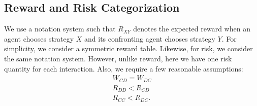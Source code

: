\documentclass[letterpaper]{article} %
\begin{document}
\subsection{Reward and Risk Categorization}
\label{sec:reward_risk_categories}
We use a notation system such that $R_{XY}$ denotes the expected reward when an agent chooses strategy $X$ and its confronting agent chooses strategy $Y$. For simplicity, we consider a symmetric reward table. Likewise, for risk, we consider the same notation system. However, unlike reward, here we have one risk quantity for each interaction. Also, we require a few reasonable assumptions:
\begin{gather}
    W_{CD}=W_{DC} \\
    R_{DD}<R_{CD}\label{eq:assumption2}\\
    R_{CC}<R_{DC}.\label{eq:assumption3}
\end{gather}
\end{document}
